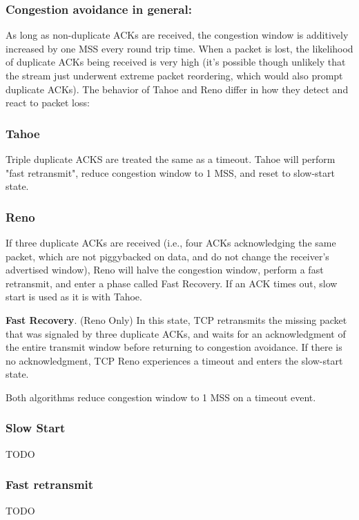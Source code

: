 \subsubsection{Congestion avoidance in general:} As long as non-duplicate ACKs
are received, the congestion window is additively increased by one MSS every
round trip time. When a packet is lost, the likelihood of duplicate ACKs being
received is very high (it's possible though unlikely that the stream just
underwent extreme packet reordering, which would also prompt duplicate ACKs).
The behavior of Tahoe and Reno differ in how they detect and react to packet loss:

\subsubsection{Tahoe}
Triple duplicate ACKS are treated the same as a timeout. Tahoe will perform
"fast retransmit", reduce congestion window to 1 MSS, and reset to slow-start
state.

\subsubsection{Reno}
If three duplicate ACKs are received (i.e., four ACKs acknowledging the
same packet, which are not piggybacked on data, and do not change the receiver's
advertised window), Reno will halve the congestion window, perform a fast
retransmit, and enter a phase called Fast Recovery. If an ACK times out, slow
start is used as it is with Tahoe.

\textbf{Fast Recovery}. (Reno Only) In this state, TCP retransmits the missing packet
that was signaled by three duplicate ACKs, and waits for an acknowledgment of
the entire transmit window before returning to congestion avoidance. If there
is no acknowledgment, TCP Reno experiences a timeout and enters the slow-start
state.

Both algorithms reduce congestion window to 1 MSS on a timeout event.

\subsubsection{Slow Start}
TODO

\subsubsection{Fast retransmit}
TODO
